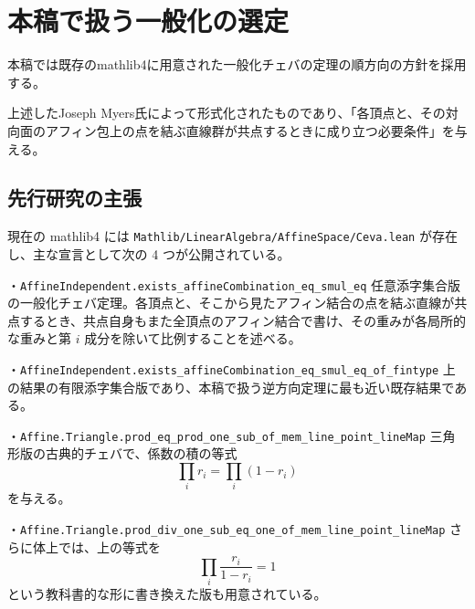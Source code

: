 \documentclass[a4paper,12pt]{bxjsbook}
\newlength{\customindent}
\newenvironment{body}{
  \par
  \begingroup
  \setlength{\leftskip}{\customindent}
  \setlength{\rightskip}{0pt}
  \setlength{\parindent}{1em}
  \setlength{\displayindent}{\customindent}
  \setlength{\displaywidth}{\dimexpr\linewidth-\customindent\relax}
}{
  \par
  \endgroup
}
\theoremstyle{theorem}
\begin{document}
    \section{本稿で扱う一般化の選定}
    \begin{body}
        \indent 本稿では既存のmathlib4に用意された一般化チェバの定理の順方向の方針を採用する。

        \indent 上述したJoseph Myers氏によって形式化されたものであり、「各頂点と、その対向面のアフィン包上の点を結ぶ直線群が共点するときに成り立つ必要条件」を与える。
    \end{body}


    \subsection{先行研究の主張}

    \begin{body}
        \indent 現在の mathlib4 には \nolinkurl{Mathlib/LinearAlgebra/AffineSpace/Ceva.lean} が存在し、主な宣言として次の 4 つが公開されている\cite{mathlib4_ceva_docs}。
    \end{body}

    \begin{bodydescription}
        \item[\hspace*{1.5em}・\nolinkurl{AffineIndependent.exists_affineCombination_eq_smul_eq}]
        任意添字集合版の一般化チェバ定理。各頂点と、そこから見たアフィン結合の点を結ぶ直線が共点するとき、共点自身もまた全頂点のアフィン結合で書け、その重みが各局所的な重みと第 $i$ 成分を除いて比例することを述べる。

        \item[\hspace*{1.5em}・\nolinkurl{AffineIndependent.exists_affineCombination_eq_smul_eq_of_fintype}]
        上の結果の有限添字集合版であり、本稿で扱う逆方向定理に最も近い既存結果である。

        \item[\hspace*{1.5em}・\nolinkurl{Affine.Triangle.prod_eq_prod_one_sub_of_mem_line_point_lineMap}]
        三角形版の古典的チェバで、係数の積の等式
        \[
          \prod_i r_i = \prod_i (1-r_i)
        \]
        を与える。

        \item[\hspace*{1.5em}・\nolinkurl{Affine.Triangle.prod_div_one_sub_eq_one_of_mem_line_point_lineMap}]
        さらに体上では、上の等式を
        \[
          \prod_i \frac{r_i}{1-r_i}=1
        \]
        という教科書的な形に書き換えた版も用意されている。
    \end{bodydescription}
\end{document}
